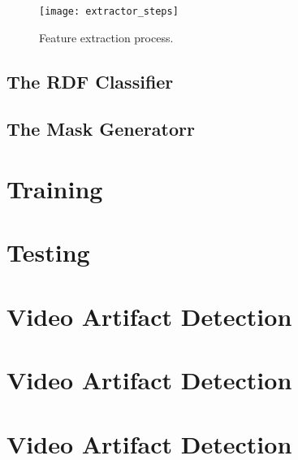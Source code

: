 \begin{figure} [!h]
  \centering
  
  \texttt{[image: extractor\_steps]}
  
  \caption{Feature extraction process. }
  \label{fig:extractor_steps}

\end{figure}

\subsection{The RDF Classifier}
\label{sec:sol_rdf}

\subsection{The Mask Generatorr}
\label{sec:sol_maskgen}

\section{Training}
\label{sec:sol_}



\section{Testing}
\label{sec:intro_problem}

\section{Video Artifact Detection}
\label{sec:intro_problem}

\section{Video Artifact Detection}
\label{sec:intro_problem}

\section{Video Artifact Detection}
\label{sec:intro_problem}
